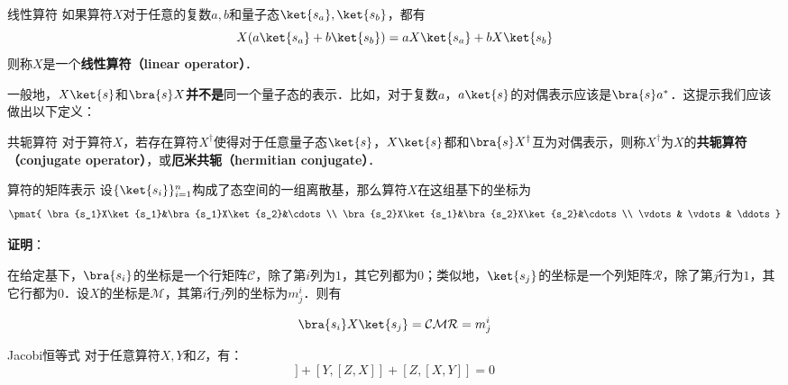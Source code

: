 \begin{definition}{线性算符}\label{QMPrcp_def11}
如果算符$X$对于任意的复数$a, b$和量子态$\ket{s_a}, \ket{s_b}$，都有
\begin{equation}
X(a\ket{s_a}+b\ket{s_b}) = aX\ket{s_a}+bX\ket{s_b}
\end{equation}
则称$X$是一个\textbf{线性算符（linear operator）}．
\end{definition}


一般地，$X\ket{s}$和$\bra{s}X$\textbf{并不是}同一个量子态的表示．比如，对于复数$a$，$a\ket{s}$的对偶表示应该是$\bra{s}a^*$．这提示我们应该做出以下定义：

\begin{definition}{共轭算符}\label{QMPrcp_def5}
对于算符$X$，若存在算符$X^\dagger$使得对于任意量子态$\ket{s}$，$X\ket{s}$都和$\bra{s}X^\dagger$互为对偶表示，则称$X^\dagger$为$X$的\textbf{共轭算符（conjugate operator）}，或\textbf{厄米共轭（hermitian conjugate）}．
\end{definition}





\begin{theorem}{算符的矩阵表示}\label{QMPrcp_the1}
设$\{\ket{s_i}\}_{i=1}^n$构成了态空间的一组离散基，那么算符$X$在这组基下的坐标为
\begin{equation}
\pmat{
    \bra{s_1}X\ket{s_1}&\bra{s_1}X\ket{s_2}&\cdots\\
    \bra{s_2}X\ket{s_1}&\bra{s_2}X\ket{s_2}&\cdots\\
    \vdots & \vdots& \ddots
}
\end{equation}
\end{theorem}

\textbf{证明}：

在给定基下，$\bra{s_i}$的坐标是一个行矩阵$\mathcal{C}$，除了第$i$列为$1$，其它列都为$0$；类似地，$\ket{s_j}$的坐标是一个列矩阵$\mathcal{R}$，除了第$j$行为$1$，其它行都为$0$．设$X$的坐标是$\mathcal{M}$，其第$i$行$j$列的坐标为$m^i_j$．则有

\begin{equation}
\bra{s_i}X\ket{s_j} = \mathcal{CMR} = m^i_j
\end{equation}




\begin{theorem}{Jacobi恒等式}
对于任意算符$X, Y$和$Z$，有：
\begin{equation}
[X, [Y, Z]]+[Y, [Z, X]]+[Z, [X, Y]]=0
\end{equation}
\end{theorem}

